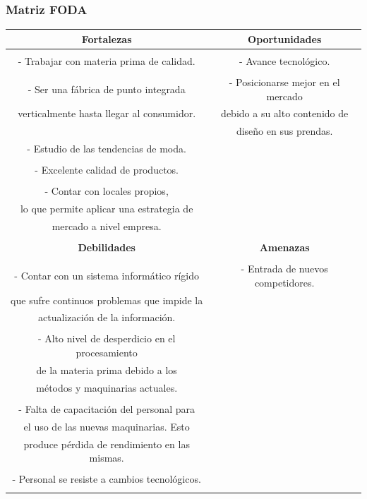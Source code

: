 \documentclass[a4paper,10pt,titlepage]{article}
\begin{document}
\subsubsection{Matriz FODA}
	\vspace*{0.5cm}
	\begin{tabular}{|c|c|}
	\hline 
	\textbf{Fortalezas} & \textbf{Oportunidades} \\ \hline & \\
- Trabajar con materia prima de calidad. & - Avance tecnol\'{o}gico.\\ &\\
- Ser una f\'{a}brica de punto integrada & - Posicionarse mejor en el mercado\\ 
  verticalmente hasta llegar al consumidor. & debido a su alto contenido de \\ & dise\~no en sus prendas. \\
- Estudio de las tendencias de moda. & \\ & \\
- Excelente calidad de productos.& \\& \\
- Contar con locales propios, & \\ lo que permite aplicar una estrategia de& \\ mercado a nivel empresa.& \\ &\\
	\hline
	\textbf{Debilidades} & \textbf{Amenazas} \\
	\hline &\\
- Contar con un sistema inform\'{a}tico r\'{i}gido& - Entrada de nuevos competidores. \\que sufre continuos problemas que impide la &\\ actualizaci\'{o}n de la informaci\'{o}n. &\\ &\\
- Alto nivel de desperdicio en el procesamiento &\\ de la materia prima debido a los &\\ m\'{e}todos y maquinarias actuales. &\\ &\\
- Falta de capacitaci\'{o}n del personal para &\\el uso de las nuevas maquinarias. Esto &\\ produce p\'{e}rdida de rendimiento en las mismas. &\\ &\\
- Personal se resiste a cambios tecnol\'{o}gicos. &\\ &\\
	\hline    
	\end{tabular}
\end{document}
